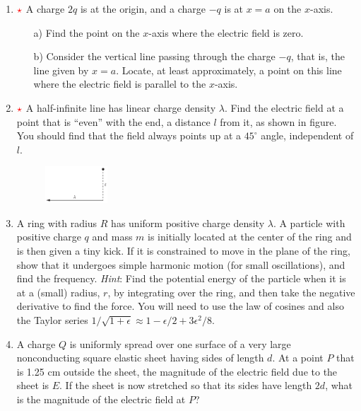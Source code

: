 \begin{enumerate}
    \item $\color{red}{\star}$ A charge $2q$ is at the origin, and a charge $-q$ is at $x=a$ on the $x$-axis.

    \begin{itemize}
        \item[a)] Find the point on the $x$-axis where the electric field is zero.
        \item[b)] Consider the vertical line passing through the charge $-q$, that is, the line given by $x=a$. Locate, at least approximately, a point on this line where the electric field is parallel to the $x$-axis.
    \end{itemize}

    \item $\color{red}{\star}$ A half-infinite line has linear charge density $\lambda$. Find the electric field at a point that is “even” with the end, a distance $l$ from it, as shown in figure. You should find that the field always points up at a $45^\circ$ angle, independent of $l$.

    \begin{figure}[H]
        \centering
        \includegraphics[width=0.22\textwidth]{figures-workshop01/problem-18.png}
    \end{figure}

    \item A ring with radius $R$ has uniform positive charge density $\lambda$. A particle with positive charge $q$ and mass $m$ is initially located at the center of the ring and is then given a tiny kick. If it is constrained to move in the plane of the ring, show that it undergoes simple harmonic motion (for small oscillations), and find the frequency. \textit{Hint}: Find the potential energy of the particle when it is at a (small) radius, $r$, by integrating over the ring, and then take the negative derivative to find the force. You will need to use the law of cosines and also the Taylor series $1/\sqrt{1+\epsilon}\approx1-\epsilon/2+3\epsilon^2/8$.

    \item A charge $Q$ is uniformly spread over one surface of a very large nonconducting square elastic sheet having sides of length $d$. At a point $P$ that is 1.25 cm outside the sheet, the magnitude of the electric field due to the sheet is $E$. If the sheet is now stretched so that its sides have length $2d$, what is the magnitude of the electric field at $P$?


\end{enumerate}
